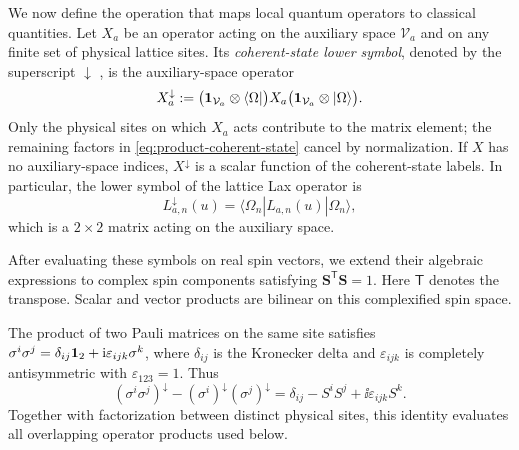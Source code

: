 We now define the operation that maps local quantum operators to classical
quantities.  Let $X_a$ be an operator acting on the auxiliary space
$\mathcal V_a$ and on any finite set of physical lattice sites.  Its
\emph{coherent-state lower symbol}, denoted by the superscript $\downarrow$
\cite{BiskupChayesStarr2007}, is the auxiliary-space operator
\begin{equation}
X_a^{\downarrow}
:=
\bigl(\mathbf{1}_{\mathcal V_a}\otimes\langle\Omega|\bigr)
X_a
\bigl(\mathbf{1}_{\mathcal V_a}\otimes|\Omega\rangle\bigr).
\label{eq:lower-symbol-definition}
\end{equation}
Only the physical sites on which $X_a$ acts contribute to the matrix element;
the remaining factors in \eqref{eq:product-coherent-state} cancel by
normalization.  If $X$ has no auxiliary-space indices, $X^{\downarrow}$ is a
scalar function of the coherent-state labels.  In particular, the lower
symbol of the lattice Lax operator is
\begin{equation}
L_{a,n}^{\downarrow}(u)
=
\langle\Omega_n|L_{a,n}(u)|\Omega_n\rangle,
\label{eq:lattice-Lax-lower-symbol}
\end{equation}
which is a $2\times2$ matrix acting on the auxiliary space.

After evaluating these symbols on real spin vectors, we extend their
algebraic expressions to complex spin components satisfying
$\boldsymbol S^{\mathsf T}\boldsymbol S=1$.  Here $\mathsf T$ denotes the
transpose.  Scalar and vector products are bilinear on this complexified
spin space.

The product of two Pauli matrices on the same site satisfies
$\sigma^i\sigma^j=\delta_{ij}\mathbf{1}_2+\mathrm{i}\varepsilon_{ijk}\sigma^k$,
where $\delta_{ij}$ is the Kronecker delta and $\varepsilon_{ijk}$
is completely antisymmetric with $\varepsilon_{123}=1$.  Thus
\begin{equation}
(\sigma^i\sigma^j)^\downarrow
-(\sigma^i)^\downarrow(\sigma^j)^\downarrow
=\delta_{ij}-S^iS^j+\ii\varepsilon_{ijk}S^k.
\label{eq:single-site-pauli-symbol-product}
\end{equation}
Together with factorization between distinct physical sites, this
identity evaluates all overlapping operator products used below.

